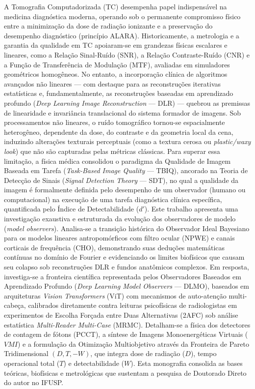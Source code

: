 \documentclass[
  12pt,
  a4paper,
  oneside
]{report}
\begin{document}
A Tomografia Computadorizada (TC) desempenha papel indispensável na medicina diagnóstica moderna, operando sob o permanente compromisso físico entre a minimização da dose de radiação ionizante e a preservação do desempenho diagnóstico (princípio ALARA). Historicamente, a metrologia e a garantia da qualidade em TC apoiaram-se em grandezas físicas escalares e lineares, como a Relação Sinal-Ruído (SNR), a Relação Contraste-Ruído (CNR) e a Função de Transferência de Modulação (MTF), avaliadas em simuladores geométricos homogêneos. No entanto, a incorporação clínica de algoritmos avançados não lineares --- com destaque para as reconstruções iterativas estatísticas e, fundamentalmente, as reconstruções baseadas em aprendizado profundo (\emph{Deep Learning Image Reconstruction} --- DLR) --- quebrou as premissas de linearidade e invariância translacional do sistema formador de imagens. Sob processamentos não lineares, o ruído tomográfico tornou-se espacialmente heterogêneo, dependente da dose, do contraste e da geometria local da cena, induzindo alterações texturais perceptuais (como a textura cerosa ou \emph{plastic/waxy look}) que não são capturadas pelas métricas clássicas. Para superar essa limitação, a física médica consolidou o paradigma da Qualidade de Imagem Baseada em Tarefa (\emph{Task-Based Image Quality} --- TBIQ), ancorado na Teoria de Detecção de Sinais (\emph{Signal Detection Theory} --- SDT), no qual a qualidade da imagem é formalmente definida pelo desempenho de um observador (humano ou computacional) na execução de uma tarefa diagnóstica clínica específica, quantificada pelo Índice de Detectabilidade ($d'$). Este trabalho apresenta uma investigação exaustiva e estruturada da evolução dos observadores de modelo (\emph{model observers}). Analisa-se a transição histórica do Observador Ideal Bayesiano para os modelos lineares antropomórficos com filtro ocular (NPWE) e canais corticais de frequência (CHO), demonstrando suas deduções matemáticas contínuas no domínio de Fourier e evidenciando os limites biofísicos que causam seu colapso sob reconstruções DLR e fundos anatômicos complexos. Em resposta, investiga-se a fronteira científica representada pelos Observadores Baseados em Aprendizado Profundo (\emph{Deep Learning Model Observers} --- DLMO), baseados em arquiteturas \emph{Vision Transformers} (ViT) com mecanismos de auto-atenção multi-cabeça, calibrados diretamente contra leituras psicofísicas de radiologistas em experimentos de Escolha Forçada entre Duas Alternativas (2AFC) sob análise estatística \emph{Multi-Reader Multi-Case} (MRMC). Detalham-se a física dos detectores de contagem de fótons (PCCT), a síntese de Imagens Monoenergéticas Virtuais ($VMI$) e a formulação da Otimização Multiobjetivo através da Fronteira de Pareto Tridimensional $(D, T, -W)$, que integra dose de radiação ($D$), tempo operacional total ($T$) e detectabilidade ($W$). Esta monografia consolida as bases teóricas, biofísicas e metrológicas que sustentam a pesquisa de Doutorado Direto do autor no IFUSP.
\end{document}
